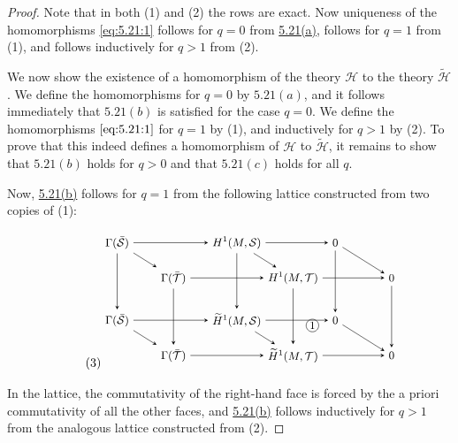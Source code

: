 \begin{proof}
Note that in both (1) and (2) the rows are exact. Now uniqueness of the homomorphisms \eqref{eq:5.21:1} follows for $q=0$ from \hyperref[thm:5.21]{5.21(a)}, follows for $q=1$ from (1), and follows inductively for $q>1$ from (2).

We now show the existence of a homomorphism of the theory $\mathcal{H}$ to the theory $\widetilde{\mathcal{H}}$. We define the homomorphisms for $q=0$ by $5.21(a)$, and it follows immediately that $5.21(b)$ is satisfied for the case $q=0$. We define the homomorphisms $\eqref{eq:5.21:1}$ for $q=1$ by (1), and inductively for $q>1$ by (2). To prove that this indeed defines a homomorphism of $\mathcal{H}$ to $\widetilde{\mathcal{H}}$, it remains to show that $5.21(b)$ holds for $q>0$ and that $5.21(c)$ holds for all $q$.

Now, \hyperref[thm:5.21]{5.21(b)} follows for $q = 1$ from the following lattice constructed from two copies of (1):

\begin{equation}
\tag{3}\label{eq:5.23:3}
\begin{tikzpicture}[>=stealth,every node/.style={font=\small}]
\node (A1) at (0,0) {$\Gamma(\bar{\mathcal{S}})$};
\node (B1) at (3.4,0) {$H^{1}(M,\mathcal{S})$};
\node (C1) at (6.2,0) {$0$};
\node (A2) at (0,-2.2) {$\Gamma(\bar{\mathcal{S}})$};
\node (B2) at (3.4,-2.2) {$\widetilde{H}^{1}(M,\mathcal{S})$};
\node (C2) at (6.2,-2.2) {$0$};
\node (A1b) at (1.6,-1.0) {$\Gamma(\bar{\mathcal{T}})$};
\node (B1b) at (5.0,-1.0) {$H^{1}(M,\mathcal{T})$};
\node (C1b) at (7.8,-1.0) {$0$};
\node (A2b) at (1.6,-3.2) {$\Gamma(\bar{\mathcal{T}})$};
\node (B2b) at (5.0,-3.2) {$\widetilde{H}^{1}(M,\mathcal{T})$};
\node (C2b) at (7.8,-3.2) {$0$};
\draw[->] (A1) -- (B1); \draw[->] (B1) -- (C1);
\draw[->] (A2) -- (B2); \draw[->] (B2) -- (C2);
\draw[->] (A1b) -- (B1b); \draw[->] (B1b) -- (C1b);
\draw[->] (A2b) -- (B2b); \draw[->] (B2b) -- (C2b);
\draw[->] (A1) -- (A1b); \draw[->] (B1) -- (B1b); \draw[->] (C1) -- (C1b);
\draw[->] (A2) -- (A2b); \draw[->] (B2) -- (B2b); \draw[->] (C2) -- (C2b);
\draw[->] (A1) -- (A2); \draw[->] (B1) -- (B2); \draw[->] (C1) -- (C2);
\draw[->] (A1b) -- (A2b); \draw[->] (B1b) -- (B2b); \draw[->] (C1b) -- (C2b);
\node at (5.55,-2.35) {\text{\circled{1}}};
\end{tikzpicture}
\end{equation}

In the lattice, the commutativity of the right-hand face  is forced by the a priori commutativity of all the other faces, and \hyperref[thm:5.21]{5.21(b)} follows inductively for $q>1$ from the analogous lattice constructed from (2).


\end{proof}
